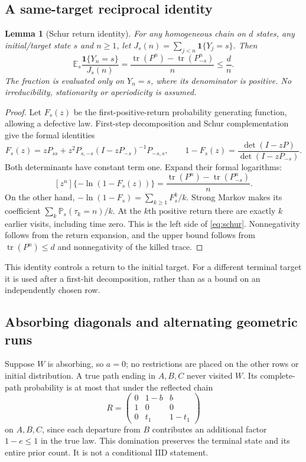 \documentclass[11pt,letterpaper]{article}
\newtheorem{lemma}[theorem]{Lemma}
\theoremstyle{definition}\newtheorem{definition}[theorem]{Definition}
\theoremstyle{remark}\newtheorem{remark}[theorem]{Remark}
\newcommand{\E}{\mathbb{E}}
\newcommand{\Prob}{\mathbb{P}}
\newcommand{\ind}{\mathbf{1}}
\begin{document}
\subsection{A same-target reciprocal identity}
\begin{lemma}[Schur return identity]\label{lem:schur}
For any homogeneous chain on $d$ states, any initial/target state $s$ and $n\ge1$, let $J_s(n)=\sum_{j<n}\ind\{Y_j=s\}$. Then
\begin{equation}\label{eq:schur}
 \E_s\frac{\ind\{Y_n=s\}}{J_s(n)}
 =\frac{\operatorname{tr}(P^n)-\operatorname{tr}(P_{-s}^n)}n
 \le\frac dn .
\end{equation}
The fraction is evaluated only on $Y_n=s$, where its denominator is positive. No irreducibility, stationarity or aperiodicity is assumed.
\end{lemma}
\begin{proof}
Let $F_s(z)$ be the first-positive-return probability generating function, allowing a defective law. First-step decomposition and Schur complementation give the formal identities
\[
 F_s(z)=zP_{ss}+z^2P_{s,-s}(I-zP_{-s})^{-1}P_{-s,s},
 \qquad
 1-F_s(z)=\frac{\det(I-zP)}{\det(I-zP_{-s})}.
\]
Both determinants have constant term one. Expand their formal logarithms:
\[
 [z^n]\{-\ln(1-F_s(z))\}
 =\frac{\operatorname{tr}(P^n)-\operatorname{tr}(P_{-s}^n)}n.
\]
On the other hand, $-\ln(1-F_s)=\sum_{k\ge1}F_s^k/k$. Strong Markov makes its coefficient
$\sum_k\Prob_s(\tau_k=n)/k$. At the $k$th positive return there are exactly $k$ earlier visits, including time zero. This is the left side of \eqref{eq:schur}. Nonnegativity follows from the return expansion, and the upper bound follows from $\operatorname{tr}(P^n)\le d$ and nonnegativity of the killed trace.
\end{proof}

This identity controls a return to the initial target. For a different terminal target it is used after a first-hit decomposition, rather than as a bound on an independently chosen row.

\subsection{Absorbing diagonals and alternating geometric runs}
Suppose $W$ is absorbing, so $a=0$; no restrictions are placed on the other rows or initial distribution. A true path ending in $A,B,C$ never visited $W$. Its complete-path probability is at most that under the reflected chain
\[
 R=\begin{pmatrix}0&1-b&b\\1&0&0\\0&t_1&1-t_1\end{pmatrix}
\]
on $A,B,C$, since each departure from $B$ contributes an additional factor $1-e\le1$ in the true law. This domination preserves the terminal state and its entire prior count. It is not a conditional IID statement.
\end{document}
